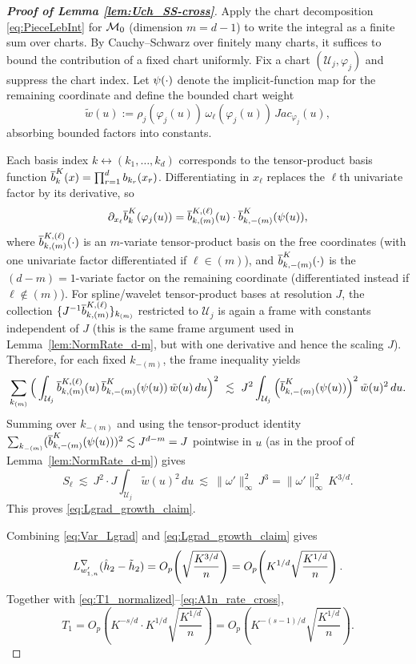\documentclass[12pt,american]{article}
\theoremstyle{definition}
\theoremstyle{plain}
\theoremstyle{definition}
\theoremstyle{plain}
\theoremstyle{plain}
\theoremstyle{plain}
\theoremstyle{plain}
\theoremstyle{plain}
\begin{document}
\begin{proof}[\textbf{Proof of Lemma \ref{lem:Uch_SS-cross}}]
Apply the chart decomposition \eqref{eq:PieceLebInt} for $\mathcal{M}_0$ (dimension $m=d-1$) to write the integral as a finite sum over charts.
By Cauchy--Schwarz over finitely many charts, it suffices to bound the contribution of a fixed chart uniformly.
Fix a chart $(\mathcal U_j,\varphi_j)$ and suppress the chart index.
Let $\psi(\cdot)$ denote the implicit-function map for the remaining coordinate and define the bounded chart weight
\[
\tilde w(u):=\rho_j(\varphi_j(u))\,\omega_\ell(\varphi_j(u))\,Jac_{\varphi_j}(u),
\]
absorbing bounded factors into constants.

Each basis index $k\leftrightarrow (k_1,\dots,k_d)$ corresponds to the tensor-product basis function
$\overline{b}_k^K(x)=\prod_{r=1}^d b_{k_r}(x_r)$.
Differentiating in $x_\ell$ replaces the $\ell$th univariate factor by its derivative, so
\[
\partial_{x_\ell}\overline{b}_k^K(\varphi_j(u))
=\overline{b}^{K,(\ell)}_{k,(m)}(u)\cdot\overline{b}_{k,-(m)}^{K}(\psi(u)),
\]
where $\overline{b}^{K,(\ell)}_{k,(m)}(\cdot)$ is an $m$-variate tensor-product basis on the free coordinates (with one univariate factor differentiated if $\ell\in(m)$),
and $\overline{b}_{k,-(m)}^{K}(\cdot)$ is the $(d-m)=1$-variate factor on the remaining coordinate (differentiated instead if $\ell\notin(m)$).
For spline/wavelet tensor-product bases at resolution $J$, the collection $\{J^{-1}\overline{b}^{K,(\ell)}_{k,(m)}\}_{k_{(m)}}$ restricted to $\mathcal U_j$
is again a frame with constants independent of $J$ (this is the same frame argument used in Lemma~\ref{lem:NormRate_d-m}, but with one derivative and hence the scaling $J$).
Therefore, for each fixed $k_{-(m)}$, the frame inequality yields
\[
\sum_{k_{(m)}}\Big(\int_{\mathcal U_j}\overline{b}^{K,(\ell)}_{k,(m)}(u)\,\overline{b}_{k,-(m)}^{K}(\psi(u))\,\tilde w(u)\,du\Big)^2
\ \lesssim\ J^2\int_{\mathcal U_j}\Big(\overline{b}_{k,-(m)}^{K}(\psi(u))\Big)^2\,\tilde w(u)^2\,du.
\]
Summing over $k_{-(m)}$ and using the tensor-product identity
$\sum_{k_{-(m)}}(\overline{b}_{k,-(m)}^{K}(\psi(u)))^2\lesssim J^{d-m}=J$ pointwise in $u$
(as in the proof of Lemma~\ref{lem:NormRate_d-m}) gives
\[
S_\ell
\ \lesssim\ J^2\cdot J\int_{\mathcal U_j}\tilde w(u)^2\,du
\ \lesssim\ \|\omega'\|_\infty^2\,J^3
=\|\omega'\|_\infty^2\,K^{3/d}.
\]
This proves \eqref{eq:Lgrad_growth_claim}.

Combining \eqref{eq:Var_Lgrad} and \eqref{eq:Lgrad_growth_claim} gives
\[
L^{\nabla}_{w'_{1,n}}(\hat h_2-\tilde{h}_2)
=O_p\!\left(\sqrt{\frac{K^{3/d}}{n}}\right)
=O_p\!\left(K^{1/d}\sqrt{\frac{K^{1/d}}{n}}\right).
\]
Together with \eqref{eq:T1_normalized}--\eqref{eq:A1n_rate_cross},
\begin{equation}\label{eq:T1_rate}
T_{1}
=O_p\!\left(K^{-s/d}\cdot K^{1/d}\sqrt{\frac{K^{1/d}}{n}}\right)
=O_p\!\left(K^{-(s-1)/d}\sqrt{\frac{K^{1/d}}{n}}\right).
\end{equation}


\end{proof}
\end{document}
